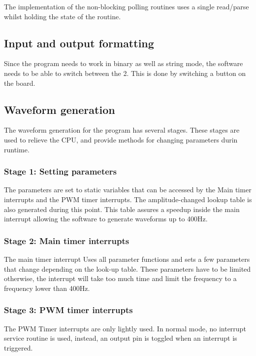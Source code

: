 The implementation of the non-blocking polling routines uses a single read/parse whilst
holding the state of the routine.

\subsection{Input and output formatting}
Since the program needs to work in binary as well as string mode, the software needs to
be able to switch between the 2. This is done by switching a button on the board.

\subsection{Waveform generation}
The waveform generation for the program has several stages. These stages are used
to relieve the CPU, and provide methods for changing parameters durin runtime.
\subsubsection{Stage 1: Setting parameters}
The parameters are set to static variables that can be accessed by the Main timer interrupts
and the PWM timer interrupts. The amplitude-changed lookup table is also generated during this
point. This table assures a speedup inside the main interrupt allowing the software to generate
waveforms up to 400Hz.
\subsubsection{Stage 2: Main timer interrupts}
The main timer interrupt Uses all parameter functions and sets a few parameters that change
depending on the look-up table. These parameters have to be limited otherwise, the interrupt
will take too much time and limit the frequency to a frequency lower than 400Hz.
\subsubsection{Stage 3: PWM timer interrupts}
The PWM Timer interrupts are only lightly used. In normal mode, no interrupt service routine is used, instead, an output pin is toggled when an interrupt is triggered.
